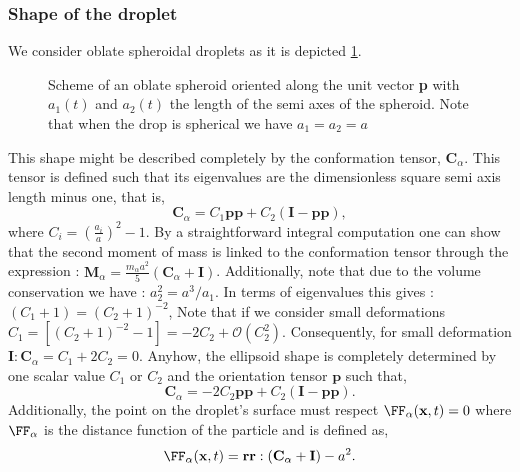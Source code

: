 \subsubsection*{Shape of the droplet}
We consider oblate spheroidal droplets as it is depicted \ref{fig:scheme_spheroid}. 
\begin{figure}[h!]
    \centering
    \hfill
    \hfill
    \caption{Scheme of an  oblate spheroid oriented along the unit vector \textbf{p} with $a_1(t)$ and $a_2(t)$ the length of the semi axes of the spheroid.
    Note that when the drop is spherical we have $a_1=a_2=a$}
    \label{fig:scheme_spheroid}
\end{figure}
This shape might be described completely by the conformation tensor, $\textbf{C}_\alpha$.
This tensor is defined such that its eigenvalues are the dimensionless square semi axis length minus one, that is,
\begin{equation*}
    \textbf{C}_\alpha
    =  C_1\textbf{pp}
    + C_2 (\textbf{I} - \textbf{pp}),
\end{equation*}
where $C_i = \left(\frac{a_i}{a}\right)^2 - 1$. 
By a straightforward integral computation one can show that the second moment of mass is linked to the conformation tensor through the expression : $\textbf{M}_\alpha = \frac{m_\alpha a^2}{5}(\textbf{C}_\alpha + \textbf{I})$. 
Additionally, note that due to the volume conservation we have : $ a_2^2 = a^3 /a_1$. 
In terms of eigenvalues this gives : $(C_1+1) = (C_2+1)^{-2}$, 
Note that if we consider small deformations $C_1 = [(C_2+1)^{-2} - 1]= -2 C_2 + \mathcal{O}(C_2^2)$. 
Consequently, for small deformation $\textbf{I}:\textbf{C}_\alpha = C_1 + 2C_2 = 0$. 
Anyhow, the ellipsoid shape is completely determined by one scalar value $C_1$ or $C_2$ and the orientation tensor $\textbf{p}$ such that, 
\begin{equation*}
    \textbf{C}_\alpha
    =  -2 C_2\textbf{pp} 
    + C_2 (\textbf{I} - \textbf{pp}). 
\end{equation*}
Additionally, the point on the droplet's surface must respect $\FF_\alpha(\textbf{x},t) = 0$ where $\FF_\alpha$ is the distance function of the particle and is defined as, 
\begin{equation*}
    \FF_\alpha(\textbf{x},t) = \textbf{rr}:(\textbf{C}_\alpha + \textbf{I}) -a^2.  
    \label{eq:distance_function}
\end{equation*}


